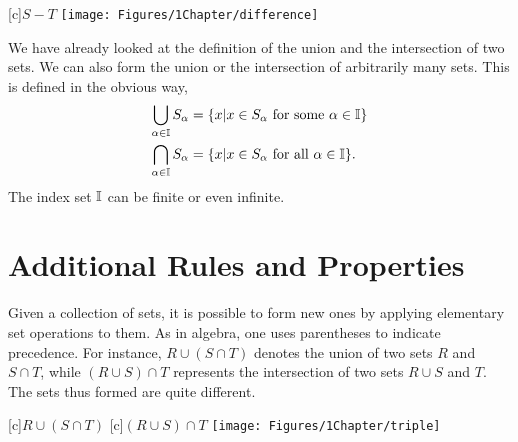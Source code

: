 \begin{center}
\begin{psfrags}
[c]{$S - T$}
\texttt{[image: Figures/1Chapter/difference]}
\end{psfrags}
\end{center}

We have already looked at the definition of the union and the intersection of two sets.
We can also form the union or the intersection of arbitrarily many sets.
This is defined in the obvious way,
\begin{align*}
\bigcup_{\alpha \in \mathbb{I}} S_{\alpha}
&= \{ x | x \in S_{\alpha} \text{ for some } \alpha \in \mathbb{I} \} \\
\bigcap_{\alpha \in \mathbb{I}} S_{\alpha}
&= \{ x | x \in S_{\alpha} \text{ for all } \alpha \in \mathbb{I} \} .
\end{align*}
The index set $\mathbb{I}$ can be finite or even infinite.


\section{Additional Rules and Properties}

Given a collection of sets, it is possible to form new ones by applying elementary set operations to them.
As in algebra, one uses parentheses to indicate precedence.
For instance, $R \cup (S \cap T)$ denotes the union of two sets $R$ and $S \cap T$, while $(R \cup S) \cap T$ represents the intersection of two sets $R \cup S$ and $T$.
The sets thus formed are quite different.

\begin{center}
\begin{psfrags}
[c]{$R \cup (S \cap T)$}
[c]{$(R \cup S) \cap T$}
\texttt{[image: Figures/1Chapter/triple]}
\end{psfrags}
\end{center}


